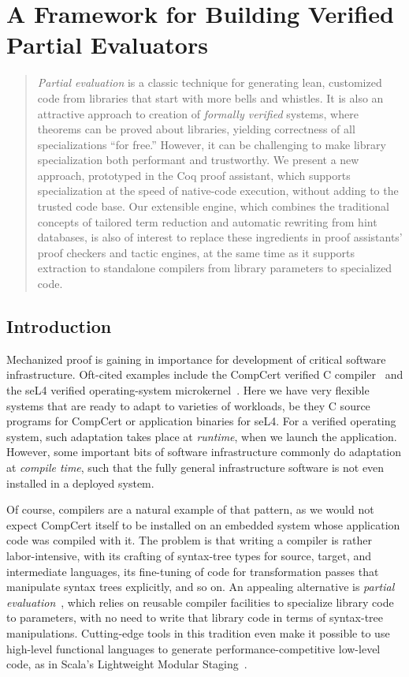 \chapter{A Framework for Building Verified Partial Evaluators}
\begin{abstract}
  \emph{Partial evaluation} is a classic technique for generating lean, customized code from libraries that start with more bells and whistles.
  It is also an attractive approach to creation of \emph{formally verified} systems, where theorems can be proved about libraries, yielding correctness of all specializations ``for free.''
  However, it can be challenging to make library specialization both performant and trustworthy.
  We present a new approach, prototyped in the Coq proof assistant, which supports specialization at the speed of native-code execution, without adding to the trusted code base.
  Our extensible engine, which combines the traditional concepts of tailored term reduction and automatic rewriting from hint databases, is also of interest to replace these ingredients in proof assistants' proof checkers and tactic engines, at the same time as it supports extraction to standalone compilers from library parameters to specialized code.
\end{abstract}

\section{Introduction} \label{sec:rewriting:intro}

Mechanized proof is gaining in importance for development of critical software infrastructure.
Oft-cited examples include the CompCert verified C compiler~\cite{Compcert} and the seL4 verified operating-system microkernel~\cite{seL4SOSP09}.
Here we have very flexible systems that are ready to adapt to varieties of workloads, be they C source programs for CompCert or application binaries for seL4.
For a verified operating system, such adaptation takes place at \emph{runtime}, when we launch the application.
However, some important bits of software infrastructure commonly do adaptation at \emph{compile time}, such that the fully general infrastructure software is not even installed in a deployed system.

Of course, compilers are a natural example of that pattern, as we would not expect CompCert itself to be installed on an embedded system whose application code was compiled with it.
The problem is that writing a compiler is rather labor-intensive, with its crafting of syntax-tree types for source, target, and intermediate languages, its fine-tuning of code for transformation passes that manipulate syntax trees explicitly, and so on.
An appealing alternative is \emph{partial evaluation}~\cite{PartialEvaluation}, which relies on reusable compiler facilities to specialize library code to parameters, with no need to write that library code in terms of syntax-tree manipulations.
Cutting-edge tools in this tradition even make it possible to use high-level functional languages to generate performance-competitive low-level code, as in Scala's Lightweight Modular Staging~\cite{LMS}.

